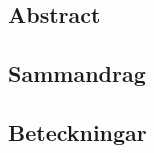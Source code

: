 \subsection*{Abstract} %
\label{sub:abstract}


\subsection*{Sammandrag} %
\label{sub:sammandrag}

\newpage

\subsection*{Beteckningar} %
\label{sub:beteckningar}

